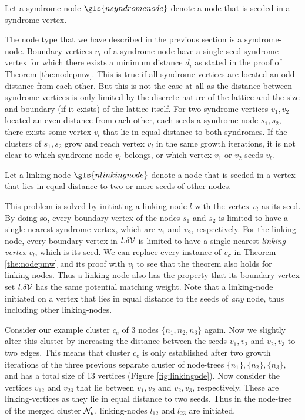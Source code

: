 \begin{definition}\label{def:syndromenode}
  Let a syndrome-node $\gls{nsyndromenode}$ denote a node that is seeded in a syndrome-vertex. 
\end{definition}

The node type that we have described in the previous section is a syndrome-node. Boundary vertices $v_i$ of a syndrome-node have a single seed syndrome-vertex for which there exists a minimum distance $d_i$ as stated in the proof of Theorem \ref{the:nodepmw}. This is true if all syndrome vertices are located an odd distance from each other. But this is not the case at all as the distance between syndrome vertices is only limited by the discrete nature of the lattice and the size and boundary (if it exists) of the lattice itself. For two syndrome vertices $v_1, v_2$ located an even distance from each other, each seeds a syndrome-node $s_1, s_2$, there exists some vertex $v_{l}$ that lie in equal distance to both syndromes. If the clusters of $s_1, s_2$ grow and reach vertex $v_{l}$ in the same growth iterations, it is not clear to which syndrome-node $v_l$ belongs, or which vertex $v_1$ or $v_2$ seeds $v_l$. 

\begin{definition}\label{def:linkingnode}
  Let a linking-node $\gls{nlinkingnode}$ denote a node that is seeded in a vertex that lies in equal distance to two or more seeds of other nodes. 
\end{definition}

This problem is solved by initiating a linking-node $l$ with the vertex $v_l$ as its seed. By doing so, every boundary vertex of the nodes $s_1$ and $s_2$ is limited to have a single nearest syndrome-vertex, which are $v_1$ and $v_2$, respectively. For the linking-node, every boundary vertex in $l.\delta \mathcal{V}$ is limited to have a single nearest \emph{linking-vertex} $v_l$, which is its seed. We can replace every instance of $v_\sigma$ in Theorem \ref{the:nodepmw} and its proof with $v_l$ to see that the theorem also holds for linking-nodes. Thus a linking-node also has the property that its boundary vertex set $l.\delta \mathcal{V}$ has the same potential matching weight. Note that a linking-node initiated on a vertex that lies in equal distance to the seeds of \emph{any} node, thus including other linking-nodes. 

Consider our example cluster $c_e$ of 3 nodes $\{n_1, n_2, n_3\}$ again. Now we slightly alter this cluster by increasing the distance between the seeds $v_1, v_2$ and $v_2, v_3$ to two edges. This means that cluster $c_e$ is only established after two growth iterations of the three previous separate cluster of node-trees $\{n_1\}, \{n_2\}, \{n_3\}$, and has a total size of 13 vertices (Figure \ref{fig:linkingode}). Now consider the vertices $v_{12}$ and $v_{23}$ that lie between $v_1, v_2$ and $v_2, v_3$, respectively. These are linking-vertices as they lie in equal distance to two seeds. Thus in the node-tree of the merged cluster $\mathcal{N}_e$, linking-nodes $l_{12}$ and $l_{23}$ are initiated. 


